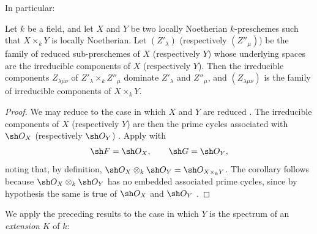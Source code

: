 In particular:

\begin{corollary}[4.2.6]
\label{IV.4.2.6}
Let $k$ be a field, and let $X$ and $Y$ be two locally Noetherian
$k$-preschemes such that $X\times_k Y$ is locally Noetherian.
Let $(Z'_\lambda)$ \textup{(respectively $(Z''_\mu)$)} be the family of reduced
sub-preschemes of $X$ \textup{(respectively $Y$)} whose underlying spaces are
the irreducible components of $X$ \textup{(respectively $Y$)}.
Then the irreducible components $Z_{\lambda\mu\nu}$ of
$Z'_\lambda\times_k Z''_\mu$ dominate $Z'_\lambda$ and $Z''_\mu$, and
$(Z_{\lambda\mu\nu})$ is the family of irreducible components of
$X\times_k Y$.
\end{corollary}

\begin{proof}
We may reduce to the case in which $X$ and $Y$ are reduced
.
The irreducible components of $X$ (respectively $Y$) are then the prime
cycles associated with $\sh O_X$ (respectively $\sh O_Y$)
.
Apply  with
\[
\sh F=\sh O_X,
\qquad
\sh G=\sh O_Y,
\]
noting that, by definition, $\sh O_X\otimes_k\sh O_Y=\sh O_{X\times_k Y}$.
The corollary follows because $\sh O_X\otimes_k\sh O_Y$ has no embedded
associated prime cycles, since by hypothesis the same is true of
$\sh O_X$ and $\sh O_Y$ .
\end{proof}

We apply the preceding results to the case in which $Y$ is the spectrum
of an \emph{extension} $K$ of $k$:

